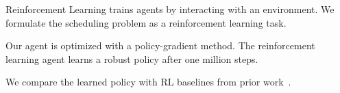 Reinforcement Learning trains agents by interacting with an environment. We formulate the scheduling problem as a reinforcement learning task.

Our agent is optimized with a policy-gradient method. The reinforcement learning agent learns a robust policy after one million steps.

We compare the learned policy with RL baselines from prior work~\cite{rl2018}.
